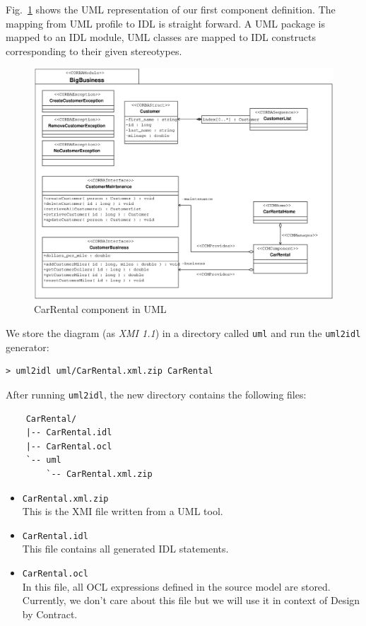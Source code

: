 Fig.~\ref{fig:uml-component-example} shows the UML representation of our first 
component definition.
The mapping from UML profile to IDL is straight forward. A UML 
package is mapped to an IDL module, UML classes are mapped to IDL constructs
corresponding to their given stereotypes.
\begin{figure}[htb]
    \begin{center}
        \includegraphics [width=15cm,angle=0] {uml/Example1}
        \caption{CarRental component in UML}
        \label{fig:uml-component-example}
    \end{center}
\end{figure}


We store the diagram (as {\it XMI 1.1}) in a directory called 
{\tt uml} and run the {\tt uml2idl} generator:
\begin{small}
\begin{verbatim}
> uml2idl uml/CarRental.xml.zip CarRental
\end{verbatim}
\end{small}

\newpage
After running {\tt uml2idl}, the new directory contains the following files:
\begin{small}
\begin{verbatim}
    CarRental/
    |-- CarRental.idl
    |-- CarRental.ocl
    `-- uml
        `-- CarRental.xml.zip
\end{verbatim}
\end{small}


\begin{itemize}
\item {\tt CarRental.xml.zip}\\
This is the XMI file written from a UML tool.

\item {\tt CarRental.idl}\\ 
This file contains all generated IDL statements. 

\item {\tt CarRental.ocl} \\
In this file, all OCL expressions defined in the source model are stored.
Currently, we don't care about this file but we will use it in context of
Design by Contract. 
\end{itemize}

